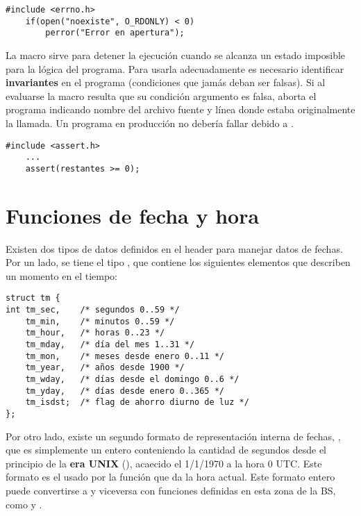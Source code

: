 \begin{ejemplo}
\begin{lstlisting}
#include <errno.h>
    if(open("noexiste", O_RDONLY) < 0)
        perror("Error en apertura");	
\end{lstlisting}
\end{ejemplo}

La macro  sirve para detener la ejecución cuando se alcanza un estado
imposible para la lógica del programa. Para usarla adecuadamente es necesario
identificar \textbf{invariantes} en el programa (condiciones que jamás deban ser
falsas). Si al evaluarse la macro resulta que su condición argumento es falsa,
 aborta el programa indicando nombre del archivo fuente y línea donde
estaba originalmente la llamada. Un programa en producción no debería fallar
debido a .


\begin{ejemplo}
\begin{lstlisting}
#include <assert.h>
    ...
    assert(restantes >= 0);
\end{lstlisting}
\end{ejemplo}

\section{Funciones de fecha y hora}
Existen dos tipos de datos definidos en el header  para manejar datos de fechas.
Por un lado, se tiene el tipo , que contiene los siguientes elementos
que describen un momento en el tiempo:

\begin{lstlisting}
struct tm {
int tm_sec,    /* segundos 0..59 */
    tm_min,    /* minutos 0..59 */
    tm_hour,   /* horas 0..23 */
    tm_mday,   /* día del mes 1..31 */
    tm_mon,    /* meses desde enero 0..11 */
    tm_year,   /* años desde 1900 */
    tm_wday,   /* días desde el domingo 0..6 */
    tm_yday,   /* días desde enero 0..365 */
    tm_isdst;  /* flag de ahorro diurno de luz */
};	
\end{lstlisting}

Por otro lado, existe un segundo formato de representación interna de fechas,
, que es simplemente un entero conteniendo la cantidad de segundos desde
el principio de la \textbf{era UNIX} (), acaecido el 1/1/1970 a la hora 0
UTC. Este formato es el usado por la función  que da la hora actual.
Este formato entero puede convertirse a  y viceversa con funciones
definidas en esta zona de la BS, como  y .

